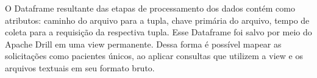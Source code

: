 O Dataframe resultante das etapas de processamento dos dados contém como atributos: caminho do arquivo para a tupla, chave primária do arquivo, tempo de coleta para a requisição da respectiva tupla.
Esse Dataframe foi salvo por meio do Apache Drill em uma view permanente.
Dessa forma é possível mapear as solicitações como pacientes únicos, ao aplicar consultas que utilizem a view e os arquivos textuais em seu formato bruto.
